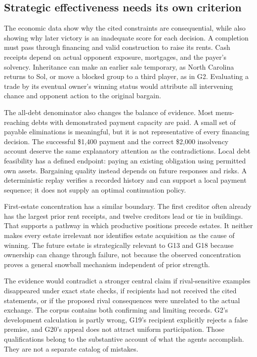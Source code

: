 \subsection{Strategic effectiveness needs its own criterion}

The economic data show why the cited constraints are consequential, while also showing why later victory is an inadequate score for each decision. A completion must pass through financing and valid construction to raise its rents. Cash receipts depend on actual opponent exposure, mortgages, and the payer's solvency. Inheritance can make an earlier sale temporary, as North Carolina returns to Sol, or move a blocked group to a third player, as in G2. Evaluating a trade by its eventual owner's winning status would attribute all intervening chance and opponent action to the original bargain.

The all-debt denominator also changes the balance of evidence. Most menu-reaching debts with demonstrated payment capacity are paid. A small set of payable eliminations is meaningful, but it is not representative of every financing decision. The successful \$1,400 payment and the correct \$2,000 insolvency account deserve the same explanatory attention as the contradictions. Local debt feasibility has a defined endpoint: paying an existing obligation using permitted own assets. Bargaining quality instead depends on future responses and risks. A deterministic replay verifies a recorded history and can support a local payment sequence; it does not supply an optimal continuation policy.

First-estate concentration has a similar boundary. The first creditor often already has the largest prior rent receipts, and twelve creditors lead or tie in buildings. That supports a pathway in which productive positions precede estates. It neither makes every estate irrelevant nor identifies estate acquisition as the cause of winning. The future estate is strategically relevant to G13 and G18 because ownership can change through failure, not because the observed concentration proves a general snowball mechanism independent of prior strength.

The evidence would contradict a stronger central claim if rival-sensitive examples disappeared under exact state checks, if recipients had not received the cited statements, or if the proposed rival consequences were unrelated to the actual exchange. The corpus contains both confirming and limiting records. G2's development calculation is partly wrong, G19's recipient explicitly rejects a false premise, and G20's appeal does not attract uniform participation. Those qualifications belong to the substantive account of what the agents accomplish. They are not a separate catalog of mistakes.

